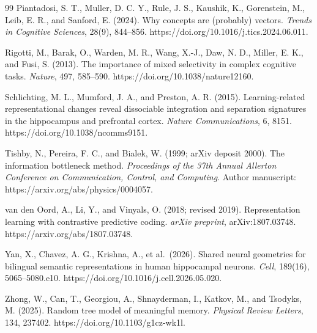 \documentclass[11pt]{article}
\begin{document}
\begin{thebibliography}{99}
Piantadosi, S. T., Muller, D. C. Y., Rule, J. S., Kaushik, K.,
Gorenstein, M., Leib, E. R., and Sanford, E. (2024). Why concepts are
(probably) vectors. \emph{Trends in Cognitive Sciences}, 28(9),
844--856. https://doi.org/10.1016/j.tics.2024.06.011.

Rigotti, M., Barak, O., Warden, M. R., Wang, X.-J., Daw, N. D., Miller,
E. K., and Fusi, S. (2013). The importance of mixed selectivity in
complex cognitive tasks. \emph{Nature}, 497, 585--590.
https://doi.org/10.1038/nature12160.

Schlichting, M. L., Mumford, J. A., and Preston, A. R. (2015).
Learning-related representational changes reveal dissociable integration
and separation signatures in the hippocampus and prefrontal cortex.
\emph{Nature Communications}, 6, 8151.
https://doi.org/10.1038/ncomms9151.

Tishby, N., Pereira, F. C., and Bialek, W. (1999; arXiv deposit 2000).
The information bottleneck method. \emph{Proceedings of the 37th Annual
Allerton Conference on Communication, Control, and Computing}. Author
manuscript: https://arxiv.org/abs/physics/0004057.

van den Oord, A., Li, Y., and Vinyals, O. (2018; revised 2019).
Representation learning with contrastive predictive coding. \emph{arXiv
preprint}, arXiv:1807.03748. https://arxiv.org/abs/1807.03748.

Yan, X., Chavez, A. G., Krishna, A., et al.~(2026). Shared neural
geometries for bilingual semantic representations in human hippocampal
neurons. \emph{Cell}, 189(16), 5065--5080.e10.
https://doi.org/10.1016/j.cell.2026.05.020.

Zhong, W., Can, T., Georgiou, A., Shnayderman, I., Katkov, M., and
Tsodyks, M. (2025). Random tree model of meaningful memory.
\emph{Physical Review Letters}, 134, 237402.
https://doi.org/10.1103/g1cz-wk1l.

\end{thebibliography}
\end{document}
